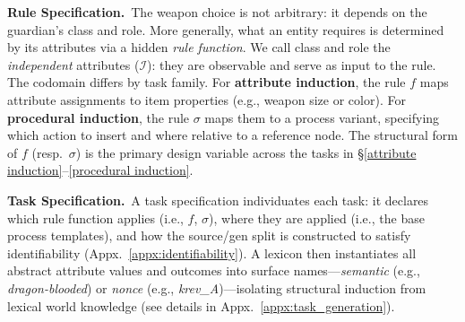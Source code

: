 \documentclass[11pt]{article}
\newcommand\jl[1]{\todo[color=blue!40]{{\bf Jessy}: #1}}
\begin{document}
\noindent\textbf{Rule Specification.}~The weapon choice is not arbitrary: it depends on the guardian's class and role. More generally, what an entity requires is determined by its attributes via a hidden \emph{rule function}. We call class and role the \emph{independent} attributes ($\mathcal{I}$): they are observable and serve as input to the rule. The codomain differs by task family. For \textbf{attribute induction}, the rule $f$ maps attribute assignments to item properties (e.g., weapon size or color). For \textbf{procedural induction}, the rule $\sigma$ maps them to a process variant, specifying which action to insert and where relative to a reference node. The structural form of $f$ (resp.\ $\sigma$) is the primary design variable across the tasks in \S\ref{attribute induction}--\ref{procedural induction}.



\noindent\textbf{Task Specification.}~A task specification individuates each task: it declares which rule function applies (i.e., $f$, $\sigma$), where they are applied (i.e., the base process templates), and how the source/gen split is constructed to satisfy identifiability (Appx.~\ref{appx:identifiability}). A lexicon then instantiates all abstract attribute values and outcomes into surface names---\emph{semantic} (e.g., \emph{dragon-blooded}) or \emph{nonce} (e.g., \emph{krev\_A})---isolating structural induction from lexical world knowledge (see details in Appx.~\ref{appx:task_generation}).
\end{document}
